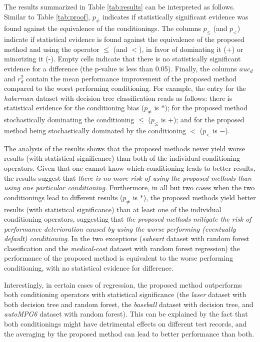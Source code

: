 \documentclass[sn-mathphys]{sn-jnl}%
\theoremstyle{thmstyleone}%
\theoremstyle{thmstyletwo}%
\theoremstyle{thmstylethree}%
\begin{document}
The results summarized in Table \ref{tab:results} can be interpreted as follows. Similar to Table \ref{tab:proof}, $p_{\neq}$ indicates if statistically significant evidence was found against the equivalence of the conditionings. The columns $p_{\leq}$ (and $p_{<}$) indicate if statistical evidence is found against the equivalence of the proposed method and using the operator $\leq$ (and $<$), in favor of dominating it (+) or minorizing it (-). Empty cells indicate that there is no statistically significant evidence for a difference (the p-value is less than 0.05). Finally, the columns $auc_d$ and $r^2_d$ contain the mean performance improvement of the proposed method compared to the worst performing conditioning. For example, the entry for the \emph{haberman} dataset with decision tree classification reads as follows: there is statistical evidence for the conditioning bias ($p_{\neq}$ is $\ast$); for the proposed method stochastically dominating the conditioning $\leq$ ($p_{\leq}$ is $+$); and for the proposed method being stochastically dominated by the conditioning $<$ ($p_{<}$ is $-$).

The analysis of the results shows that the proposed methods never yield worse results (with statistical significance) than both of the individual conditioning operators. Given that one cannot know which conditioning leads to better results, the results suggest that \emph{there is no more risk of using the proposed methods than using one particular conditioning}. Furthermore, in all but two cases when the two conditionings lead to different results ($p_{\neq}$ is $\ast$), the proposed methods yield better results (with statistical significance) than at least one of the individual conditioning operators, suggesting that \emph{the proposed methods mitigate the risk of performance deterioration caused by using the worse performing (eventually default) conditioning}. In the two exceptions (\emph{saheart} dataset with random forest classification and the \emph{medical-cost} dataset with random forest regression) the performance of the proposed method is equivalent to the worse performing conditioning, with no statistical evidence for difference.

Interestingly, in certain cases of regression, the proposed method outperforms both conditioning operators with statistical significance (the \emph{laser} dataset with both decision tree and random forest, the \emph{baseball} dataset with decision tree, and \emph{autoMPG6} dataset with random forest). This can be explained by the fact that both conditionings might have detrimental effects on different test records, and the averaging by the proposed method can lead to better performance than both.
\end{document}
